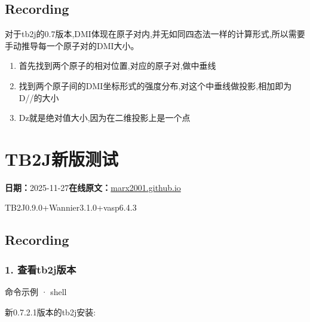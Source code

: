 \documentclass[lang=cn,scheme=chinese,color=blue,device=normal,toc=onecol,math=cm]{elegantbook}
\begin{document}
\subsection{Recording}


对于tb2j的0.7版本,DMI体现在原子对内,并无如同四态法一样的计算形式,所以需要手动推导每一个原子对的DMI大小。\par


\begin{enumerate}
\item 首先找到两个原子的相对位置,对应的原子对,做中垂线\par
\item 找到两个原子间的DMI坐标形式的强度分布,对这个中垂线做投影,相加即为D/\allowbreak{}/\allowbreak{}的大小\par
\item Dz就是绝对值大小,因为在二维投影上是一个点\par
\end{enumerate}



\section{TB2J新版测试}
\begin{articlemeta}
\textbf{日期：}2025-11-27\hfill\textbf{在线原文：}\href{https://marx2001.github.io/sci-note\_posts/20251127-tb2j-1}{marx2001.github.io}
\end{articlemeta}

TB2J0.9.0+Wannier3.1.0+vasp6.4.3\par


\subsection{Recording}


\subsubsection{1. 查看tb2j版本}


\begin{inlinecodebox}{命令示例 · shell}
\end{inlinecodebox}


新0.7.2.1版本的tb2j安装:\par
\end{document}
